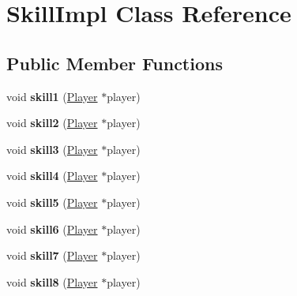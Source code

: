 \hypertarget{class_skill_impl}{\section{Skill\-Impl Class Reference}
\label{class_skill_impl}
}
\subsection*{Public Member Functions}
\begin{DoxyCompactItemize}
\item 
\hypertarget{class_skill_impl_abb993ef5b43db4c49d63d7ccc1a9a6ac}{void {\bfseries skill1} (\hyperlink{class_player}{Player} $\ast$player)}\label{class_skill_impl_abb993ef5b43db4c49d63d7ccc1a9a6ac}

\item 
\hypertarget{class_skill_impl_a2aa895799378ce55f3c3dc3abf994f82}{void {\bfseries skill2} (\hyperlink{class_player}{Player} $\ast$player)}\label{class_skill_impl_a2aa895799378ce55f3c3dc3abf994f82}

\item 
\hypertarget{class_skill_impl_a68819ffe60a16d40a4100c86e59f8a08}{void {\bfseries skill3} (\hyperlink{class_player}{Player} $\ast$player)}\label{class_skill_impl_a68819ffe60a16d40a4100c86e59f8a08}

\item 
\hypertarget{class_skill_impl_afdeefc55acda42c8d93b7f8e4837094a}{void {\bfseries skill4} (\hyperlink{class_player}{Player} $\ast$player)}\label{class_skill_impl_afdeefc55acda42c8d93b7f8e4837094a}

\item 
\hypertarget{class_skill_impl_ab38a594b4c20030cdefe170f0bf2a102}{void {\bfseries skill5} (\hyperlink{class_player}{Player} $\ast$player)}\label{class_skill_impl_ab38a594b4c20030cdefe170f0bf2a102}

\item 
\hypertarget{class_skill_impl_a5a1e7be0a91b6ed6a25b45de24521a21}{void {\bfseries skill6} (\hyperlink{class_player}{Player} $\ast$player)}\label{class_skill_impl_a5a1e7be0a91b6ed6a25b45de24521a21}

\item 
\hypertarget{class_skill_impl_a9ee3116937dc65f5caacea9843ac4d7c}{void {\bfseries skill7} (\hyperlink{class_player}{Player} $\ast$player)}\label{class_skill_impl_a9ee3116937dc65f5caacea9843ac4d7c}

\item 
\hypertarget{class_skill_impl_a2f1bedcb91fbce3fa758d33bcb18fae4}{void {\bfseries skill8} (\hyperlink{class_player}{Player} $\ast$player)}\label{class_skill_impl_a2f1bedcb91fbce3fa758d33bcb18fae4}


\end{DoxyCompactItemize}

